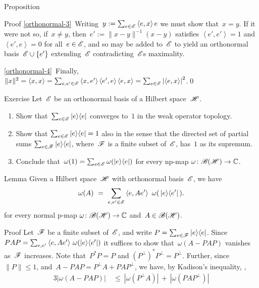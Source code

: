 \documentclass[a]{subfiles}
\begin{document}
\begin{parsec}
\begin{point}[orthonormal]{Proposition}
\begin{point}{Proof}
\ref{orthonormal-3}\
Writing~$y:=\sum_{e\in\mathscr{E}} \left<e,x\right>e$ we must show that~$x=y$.
If it were not so,
if~$x\neq y$,
then~$e':=\|x-y\|^{-1}(x-y)$
satisfies
$\left<e',e'\right>=1$
and
$\left<e',e\right>=0$
for all~$e\in\mathscr{E}$,
and so may be added to~$\mathscr{E}$
to yield an orthonormal basis~$\mathscr{E}\cup\{e'\}$
extending~$\mathscr{E}$
contradicting~$\mathscr{E}$s  maximality.

\ref{orthonormal-4}\ 
Finally,
$\|x\|^2=\left<x,x\right>
= \sum_{e,e'\in\mathscr{E}}
\left<x,e'\right>\left<e',e\right>\left<e,x\right>
= \sum_{e\in \mathscr{E}} \left|\left<e,x\right>\right|^2$.\qed
\end{point}
\end{point}
\begin{point}{Exercise}%
Let~$\mathscr{E}$ be an orthonormal basis of a Hilbert space~$\mathscr{H}$.
\begin{enumerate}
\item
Show that~$\sum_{e\in\mathscr{E}} \left|e\right>\!\left<e\right|$
converges to~$1$
in the weak operator topology.
\item
Show that $\sum_{e\in\mathscr{E}}\left|e\right>\!\left<e\right|=1$
also in the sense
that the directed
set of partial sums
$\sum_{e\in \mathscr{F}} \left|e\right>\!\left<e\right|$,
where~$\mathscr{F}$ is a finite subset of~$\mathscr{E}$,
has~$1$ as its supremum.
\item
Conclude that~$\omega(1)=\sum_{e\in\mathscr{E}} \omega(\left|e\right>\!\left<e\right|)$
for every np-map $\omega\colon \mathscr{B}(\mathscr{H})\to\mathbb{C}$.
\end{enumerate}
\end{point}
\begin{point}[bh-np-lemma]{Lemma}%
Given a Hilbert space~$\mathscr{H}$
with orthonormal basis~$\mathscr{E}$,
we have
\begin{equation*}
	\omega(A)\ = \ 
	\sum_{e,e'\in\scrE} \left<e,Ae'\right>\ \omega(\,\ketbra{e}{e'}\,).
\end{equation*}
for every normal p-map $\omega\colon \mathscr{B}(\mathscr{H})\to\mathbb{C}$
and~$A\in\mathscr{B}(\mathscr{H})$.
\begin{point}{Proof}%
Let~$\mathscr{F}$ be a finite subset of~$\mathscr{E}$,
and write $P=\sum_{e\in \mathscr{F}} \left|e\right>\!\left<e\right|$.
Since $PAP
= \sum_{e,e'}\left<e,Ae'\right>\,\omega(\left|e\right>\!\left<e'\right|)$
it suffices
to show that~$\omega(A-PAP)$
vanishes as~$\mathscr{F}$ increases.
Note that~$P^*P=P$ and
$(P^\perp)^*P^\perp=P^\perp$.
Further,
since
$\|P\|\leq 1$,
and~$A-PAP=P^\perp A + PAP^\perp$,
we have,
by Kadison's inequality, ,
\begin{alignat*}{3}
\left|\omega(A-PAP)\right|
\ &\leq\  \left|\omega(P^\perp A)\right| \,+\,\left|\omega(PAP^\perp)\right| \\

\end{alignat*}
\end{point}
\end{point}
\end{parsec}
\end{document}

